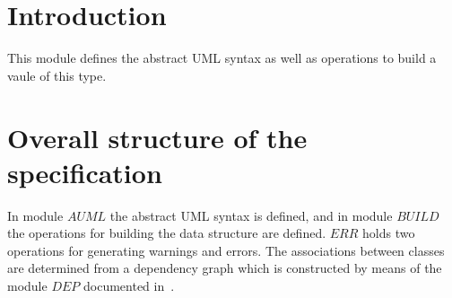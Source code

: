 \documentclass[a4paper,dvips]{article}
\begin{document}
\section{Introduction}
This module defines the abstract UML syntax as well as operations to
build a vaule of this type.

\section{Overall structure of the specification}
In module $AUML$ the abstract UML syntax is defined, and in module
$BUILD$ the operations for building the data structure are
defined. $ERR$ holds two operations for generating warnings and
errors. The associations between classes are determined from a
dependency graph which is constructed by means of the module $DEP$
documented in~\cite{depend}.










\end{document}
